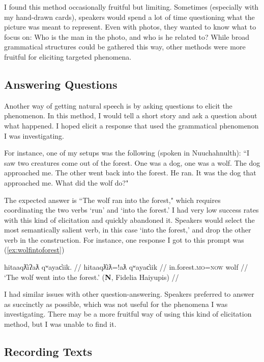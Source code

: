 I found this method occasionally fruitful but limiting. Sometimes (especially with my hand-drawn cards), speakers would spend a lot of time questioning what the picture was meant to represent. Even with photos, they wanted to know what to focus on: Who is the man in the photo, and who is he related to? While broad grammatical structures could be gathered this way, other methods were more fruitful for eliciting targeted phenomena.

\subsection{Answering Questions}

Another way of getting natural speech is by asking questions to elicit the phenomenon. In this method, I would tell a short story and ask a question about what happened. I hoped elicit a response that used the grammatical phenomenon I was investigating.

For instance, one of my setups was the following (spoken in Nuuchahnulth): ``I saw two creatures come out of the forest. One was a dog, one was a wolf. The dog approached me. The other went back into the forest. He ran. It was the dog that approached me. What did the wolf do?"

The expected answer is ``The wolf ran into the forest," which requires coordinating the two verbs `run' and `into the forest.' I had very low success rates with this kind of elicitation and quickly abandoned it. Speakers would select the most semantically salient verb, in this case `into the forest,' and drop the other verb in the construction. For instance, one response I got to this prompt was (\ref{ex:wolfintoforest})

\ex \label{ex:wolfintoforest}
\begingl
\glpreamble hitaaqƛ̓iʔaƛ qʷayac̓iik. //
\gla hitaaqƛ̓iƛ=!aƛ qʷayac̓iik //
\glb in.forest.\textsc{mo}=\textsc{now} wolf //
\glft `The wolf went into the forest.' (\textbf{N}, Fidelia Haiyupis) //
\endgl
\xe

I had similar issues with other question-answering. Speakers preferred to answer as succinctly as possible, which was not useful for the phenomena I was investigating. There may be a more fruitful way of using this kind of elicitation method, but I was unable to find it.

\subsection{Recording Texts}

